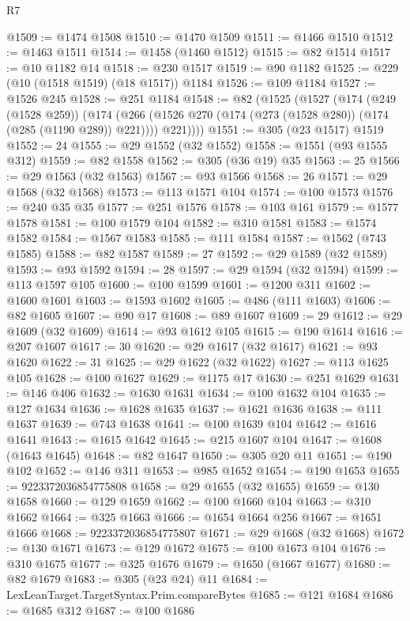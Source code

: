 \begin{lexlean}{R7}
\begin{coremodule}
@1509 := @1474 @1508
@1510 := @1470 @1509
@1511 := @1466 @1510
@1512 := @1463 @1511
@1514 := @1458 (@1460 @1512)
@1515 := @82 @1514
@1517 := @10 @1182 @14
@1518 := @230 @1517
@1519 := @90 @1182
@1525 := @229 (@10 (@1518 @1519) (@18 @1517)) @1184
@1526 := @109 @1184
@1527 := @1526 @245
@1528 := @251 @1184
@1548 := @82
    (@1525
      (@1527
        (@174
          (@249 (@1528 @259))
          (@174
            (@266 (@1526 @270 (@174 (@273 (@1528 @280)) (@174 (@285 (@1190 @289)) @221))))
            @221))))
@1551 := @305 (@23 @1517) @1519
@1552 := 24
@1555 := @29 @1552 (@32 @1552)
@1558 := @1551 (@93 @1555 @312)
@1559 := @82 @1558
@1562 := @305 (@36 @19) @35
@1563 := 25
@1566 := @29 @1563 (@32 @1563)
@1567 := @93 @1566
@1568 := 26
@1571 := @29 @1568 (@32 @1568)
@1573 := @113 @1571 @104
@1574 := @100 @1573
@1576 := @240 @35 @35
@1577 := @251 @1576
@1578 := @103 @161
@1579 := @1577 @1578
@1581 := @100 @1579 @104
@1582 := @310 @1581
@1583 := @1574 @1582
@1584 := @1567 @1583
@1585 := @111 @1584
@1587 := @1562 (@743 @1585)
@1588 := @82 @1587
@1589 := 27
@1592 := @29 @1589 (@32 @1589)
@1593 := @93 @1592
@1594 := 28
@1597 := @29 @1594 (@32 @1594)
@1599 := @113 @1597 @105
@1600 := @100 @1599
@1601 := @1200 @311
@1602 := @1600 @1601
@1603 := @1593 @1602
@1605 := @486 (@111 @1603)
@1606 := @82 @1605
@1607 := @90 @17
@1608 := @89 @1607
@1609 := 29
@1612 := @29 @1609 (@32 @1609)
@1614 := @93 @1612 @105
@1615 := @190 @1614
@1616 := @207 @1607
@1617 := 30
@1620 := @29 @1617 (@32 @1617)
@1621 := @93 @1620
@1622 := 31
@1625 := @29 @1622 (@32 @1622)
@1627 := @113 @1625 @105
@1628 := @100 @1627
@1629 := @1175 @17
@1630 := @251 @1629
@1631 := @146 @406
@1632 := @1630 @1631
@1634 := @100 @1632 @104
@1635 := @127 @1634
@1636 := @1628 @1635
@1637 := @1621 @1636
@1638 := @111 @1637
@1639 := @743 @1638
@1641 := @100 @1639 @104
@1642 := @1616 @1641
@1643 := @1615 @1642
@1645 := @215 @1607 @104
@1647 := @1608 (@1643 @1645)
@1648 := @82 @1647
@1650 := @305 @20 @11
@1651 := @190 @102
@1652 := @146 @311
@1653 := @985 @1652
@1654 := @190 @1653
@1655 := 9223372036854775808
@1658 := @29 @1655 (@32 @1655)
@1659 := @130 @1658
@1660 := @129 @1659
@1662 := @100 @1660 @104
@1663 := @310 @1662
@1664 := @325 @1663
@1666 := @1654 @1664 @256
@1667 := @1651 @1666
@1668 := 9223372036854775807
@1671 := @29 @1668 (@32 @1668)
@1672 := @130 @1671
@1673 := @129 @1672
@1675 := @100 @1673 @104
@1676 := @310 @1675
@1677 := @325 @1676
@1679 := @1650 (@1667 @1677)
@1680 := @82 @1679
@1683 := @305 (@23 @24) @11
@1684 := LexLeanTarget.TargetSyntax.Prim.compareBytes
@1685 := @121 @1684
@1686 := @1685 @312
@1687 := @100 @1686

\end{coremodule}
\end{lexlean}
